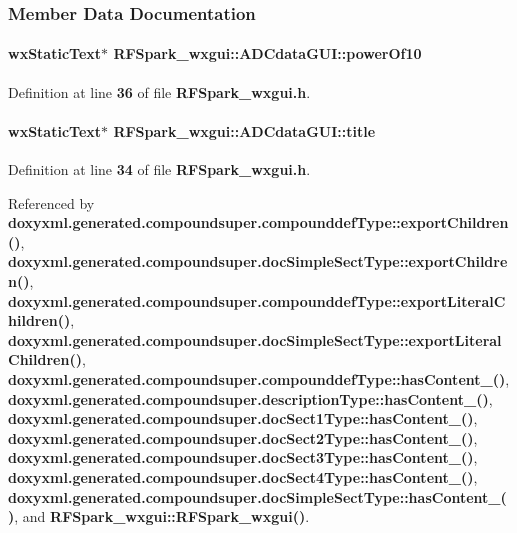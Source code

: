 \subsubsection{Member Data Documentation}
\paragraph[{power\+Of10}]{\setlength{\rightskip}{0pt plus 5cm}wx\+Static\+Text$\ast$ R\+F\+Spark\+\_\+wxgui\+::\+A\+D\+Cdata\+G\+U\+I\+::power\+Of10}\label{structRFSpark__wxgui_1_1ADCdataGUI_a9572fb17460a407135b69cd6a762a7d6}


Definition at line {\bf 36} of file {\bf R\+F\+Spark\+\_\+wxgui.\+h}.

\paragraph[{title}]{\setlength{\rightskip}{0pt plus 5cm}wx\+Static\+Text$\ast$ R\+F\+Spark\+\_\+wxgui\+::\+A\+D\+Cdata\+G\+U\+I\+::title}\label{structRFSpark__wxgui_1_1ADCdataGUI_a569eaaf0acc5cc7583a09525094305b2}


Definition at line {\bf 34} of file {\bf R\+F\+Spark\+\_\+wxgui.\+h}.



Referenced by {\bf doxyxml.\+generated.\+compoundsuper.\+compounddef\+Type\+::export\+Children()}, {\bf doxyxml.\+generated.\+compoundsuper.\+doc\+Simple\+Sect\+Type\+::export\+Children()}, {\bf doxyxml.\+generated.\+compoundsuper.\+compounddef\+Type\+::export\+Literal\+Children()}, {\bf doxyxml.\+generated.\+compoundsuper.\+doc\+Simple\+Sect\+Type\+::export\+Literal\+Children()}, {\bf doxyxml.\+generated.\+compoundsuper.\+compounddef\+Type\+::has\+Content\+\_\+()}, {\bf doxyxml.\+generated.\+compoundsuper.\+description\+Type\+::has\+Content\+\_\+()}, {\bf doxyxml.\+generated.\+compoundsuper.\+doc\+Sect1\+Type\+::has\+Content\+\_\+()}, {\bf doxyxml.\+generated.\+compoundsuper.\+doc\+Sect2\+Type\+::has\+Content\+\_\+()}, {\bf doxyxml.\+generated.\+compoundsuper.\+doc\+Sect3\+Type\+::has\+Content\+\_\+()}, {\bf doxyxml.\+generated.\+compoundsuper.\+doc\+Sect4\+Type\+::has\+Content\+\_\+()}, {\bf doxyxml.\+generated.\+compoundsuper.\+doc\+Simple\+Sect\+Type\+::has\+Content\+\_\+()}, and {\bf R\+F\+Spark\+\_\+wxgui\+::\+R\+F\+Spark\+\_\+wxgui()}.

